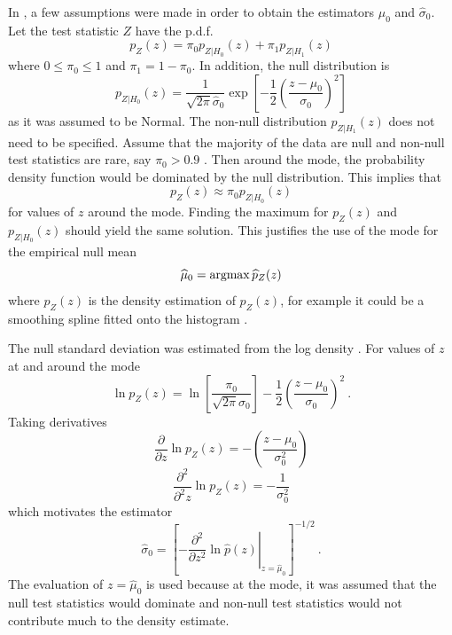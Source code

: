 In \citep{efron2004large}, a few assumptions were made in order to obtain the estimators $\widehat{\mu}_0$ and $\widehat{\sigma}_0$. Let the test statistic $Z$ have the p.d.f.
\begin{equation}
  p_Z(z) =
  \pi_0 p_{Z|H_0}(z) + \pi_1 p_{Z|H_1}(z)
\end{equation}
where $0\leqslant\pi_0\leqslant 1$ and  $\pi_1 = 1-\pi_0$. In addition, the null distribution is
\begin{equation}
  p_{Z|H_0}(z) = 
  \dfrac{1}{\sqrt{2\pi}\widehat{\sigma}_0}
  \exp\left[
    -\dfrac{1}{2}
    \left(
      \dfrac{z-{\mu}_0}{{\sigma}_0}
    \right)^2
  \right]
\end{equation}
as it was assumed to be Normal. The non-null distribution $p_{Z|H_1}(z)$ does not need to be specified. Assume that the majority of the data are null and non-null test statistics are rare, say $\pi_0>0.9$ \citep{efron2004large}. Then around the mode, the probability density function would be dominated by the null distribution. This implies that
\begin{equation}
  p_{Z}(z) \approx \pi_0 p_{Z|H_0}(z)
\end{equation}
for values of $z$ around the mode. Finding the maximum for $p_{Z}(z)$ and $p_{Z|H_0}(z)$ should yield the same solution. This justifies the use of the mode for the empirical null mean \citep{efron2004large}
\begin{equation}
  \widehat{\mu}_0 = \operatorname*{argmax}\widehat{p}_Z(z)
\end{equation}
where $\widehat{p}_Z(z)$ is the density estimation of $p_Z(z)$, for example it could be a smoothing spline fitted onto the histogram \citep{efron2004large}.

The null standard deviation was estimated from the log density \citep{efron2004large}. For values of $z$ at and around the mode
\begin{equation}
  \ln p_{Z}(z) = 
  \ln\left[
    \dfrac{\pi_0}{\sqrt{2\pi}{\sigma}_0}
  \right]
  -\dfrac{1}{2}
  \left(
    \dfrac{z-{\mu}_0}{{\sigma}_0}
  \right)^2
  \ .
\end{equation}
Taking derivatives
\begin{equation}
  \dfrac{\partial}{\partial z} \ln p_{Z}(z) =
  -\left(
    \dfrac{
      z-{\mu}_0
    }
    {
      {\sigma}_0^2
    }
  \right)
\end{equation}
\begin{equation}
  \dfrac{\partial^2}{\partial^2 z} \ln p_{Z}(z) =
  -\dfrac{
    1
  }
  {
    {\sigma}_0^2
  }
\end{equation}
which motivates the estimator \citep{efron2004large}
\begin{equation}
  \widehat{\sigma}_0 = \left[
    \left.
      -\dfrac{\partial^2}{\partial z^2}\ln\widehat{p}(z)
    \right|_{z=\widehat{\mu}_0}
  \right]^{-1/2}
  \ .
\end{equation}
The evaluation of $z=\widehat{\mu}_0$ is used because at the mode, it was assumed that the null test statistics would dominate and non-null test statistics would not contribute much to the density estimate.

